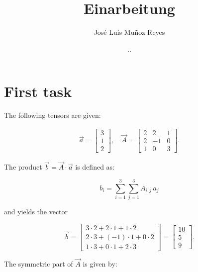 \documentclass[12pt,bibstyle=none,pagenumberinfooter]{ifmdocument}
\author{José Luis Muñoz Reyes}
\title{Einarbeitung}
\date{\the\day.\the\month.\the\year}
\begin{document}
	\maketitle
	\section{First task}

The following tensors are given: 

\begin{gather}
  \vec{a} = \begin{bmatrix}
    3 \\ 1 \\ 2
  \end{bmatrix}, \quad
  \vec{A} = \begin{bmatrix}
    2 & 2 & 1 \\ 2 & -1 & 0 \\ 1 & 0 & 3
  \end{bmatrix} .
\end{gather}

The product $\Vec{b} = \Vec{A}\cdot \Vec{a}$ is defined as:

\begin{equation}
    b_i = \sum\limits_{i=1}^3 \sum\limits_{j=1}^3  A_{i,j} \, a_j
\end{equation}

and yields the vector

\begin{equation}
    \Vec{b} = \begin{bmatrix}
        3\cdot 2 + 2\cdot1 + 1\cdot2 \\ 2\cdot3 + (-1)\cdot1 + 0\cdot2 \\ 1\cdot3 + 0\cdot1 + 2\cdot3 
    \end{bmatrix} 
    = \begin{bmatrix}
        10 \\ 5 \\ 9
    \end{bmatrix}.
\end{equation}

The symmetric part of $\vec{A}$ is given by:
\end{document}

